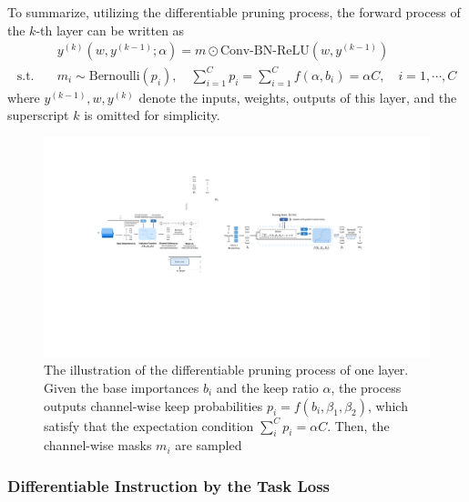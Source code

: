\documentclass[runningheads]{llncs}
\newcommand{\inexactness}{\mathcal{E}}
\begin{document}
  To summarize, utilizing the differentiable pruning process, the forward process of the $k$-th layer can be written as
  \begin{equation}
      \begin{aligned}
      & y^{(k)}(w, y^{(k-1)}; \alpha) = m \odot \mbox{Conv-BN-ReLU}(w, y^{(k-1)})\\
      \mbox{s.t.}\quad& m_i \sim \mbox{Bernoulli}(p_i), \quad\sum_{i=1}^C p_i = \sum_{i=1}^Cf(\alpha, b_i) =\alpha C, \quad i=1,\cdots,C
      \end{aligned}
      \label{eq:forward_process}
  \end{equation}
  where $y^{(k-1)}, w, y^{(k)}$ denote the inputs, weights, outputs of this layer, and the superscript $k$ is omitted for simplicity.
  
  
  
  \begin{figure}[t]
  \begin{center}
    \includegraphics[width=1.0\linewidth]{figs/dp_new.pdf}
    \caption{The illustration of the differentiable pruning process of one layer. Given the base importances $b_i$ and the keep ratio $\alpha$, the process outputs channel-wise keep probabilities $p_i = f(b_i, \beta_1, \beta_2)$, which satisfy that the expectation condition $\sum^C_i p_i = \alpha C$. Then, the channel-wise masks $m_i$ are sampled}
  
  \label{fig:differentiable_pruning}
  \end{center}
  \end{figure}
  
  
  \subsubsection{Differentiable Instruction by the Task Loss}
  
\end{document}
